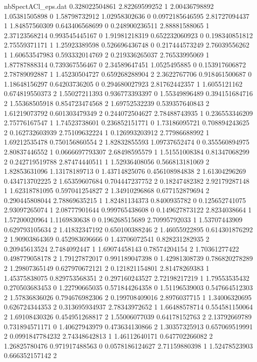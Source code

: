 \begin{filecontents}{nbSpectACl_eps.dat}
0.328022504861 2.82269599252 1
2.00436798892 1.05381505898 0
1.58798732912 1.02958302636 0
0.0972185646595 2.81727094437 1
1.84857560309 0.643406568699 0
0.248900236511 2.88881588065 1
2.37123568214 0.993545445167 0
1.91981218319 0.652232060923 0
0.198340851812 2.75559371171 1
1.25923389598 0.526696436748 0
0.217444573249 2.76039556262 1
1.60653547983 0.593332014769 2
0.219336265037 2.76533995069 1
1.87787888314 0.739367556467 0
2.34589647451 1.0525495885 0
0.153917606872 2.78789092887 1
1.45230504727 0.659268288904 2
2.3622767706 0.918461500687 0
1.18648156297 0.64203736205 0
0.294680027923 2.81762442357 1
1.6055121162 0.674819550373 2
1.55027211393 0.936773393397 0
1.55349896489 0.394151684716 2
1.55368505918 0.854723474568 2
1.69752532239 0.539357640843 2
1.61219073792 0.601303479349 2
0.244072504627 2.78488743935 1
0.236553346209 2.75776167547 1
1.74523738601 0.236852151771 0
1.73186095721 0.708894243625 2
0.162732603939 2.75109632224 1
0.126993203912 2.77986688992 1
1.69212535478 0.750156860554 2
1.82832855593 1.09737652474 0
0.355560894975 2.80837446552 1
0.0666697793307 2.68498595579 1
1.51551008384 0.81347068299 2
0.242719519788 2.87474440511 1
1.52936408056 0.566813181069 2
1.82853631096 1.13178189713 0
1.43714825076 0.456108984838 2
1.61304296269 0.434713702225 2
1.65359607684 0.704447237752 2
0.18247482382 2.92179287148 1
1.62318781095 0.597041254827 2
1.34910296868 0.677152879694 2
0.290445808044 2.78869635215 1
1.82481134373 0.8400935782 0
0.125652741075 2.93097265074 1
2.08777901644 0.999765438608 0
0.149627873122 2.8234038664 1
1.57200020964 1.1169830638 0
0.196268515689 2.70995792033 1
1.53707443909 0.629793105634 2
1.41832347192 0.650100388246 2
1.46055922895 0.614301876292 2
1.90903864369 0.452983696666 0
1.43706072541 0.828231282935 2
0.20945613524 2.7484092447 1
1.69074458143 0.78574204154 2
1.70361277422 0.498779058178 2
1.79127872017 0.991189047398 0
1.42981308739 0.786820278289 2
1.29807365149 0.627970672121 2
0.121821154801 2.81478269383 1
1.45375838075 0.829753568351 2
0.297160243527 2.72198217219 1
1.79553535432 0.270503683453 0
1.22790665035 0.571844264358 0
1.51196539003 0.547664512303 2
1.57836836026 0.794676982306 2
0.199708409016 2.8976037715 1
1.34006320695 0.626724344353 2
0.313695934937 2.78343972652 1
1.66488578714 0.554581150064 2
1.69108430326 0.454951268817 2
1.55006077039 0.64178152763 2
2.13792669789 0.731894571171 0
1.40627943979 0.473634130866 2
1.30357325913 0.657069519991 2
0.0991847784232 2.74348642813 1
1.46112640171 0.647702266082 2
1.26825780476 0.971917488563 0
0.0578186124627 2.71159880398 1
1.52478523903 0.666352157142 2

\end{filecontents}
